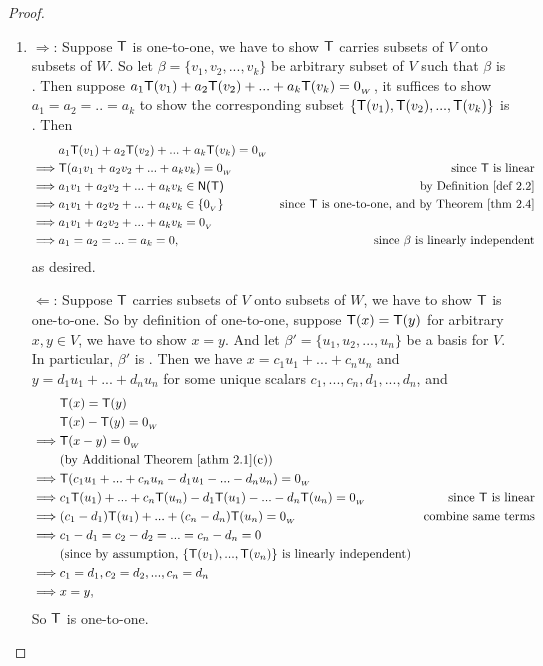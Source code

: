 \begin{proof} \ 
\begin{enumerate}
\item
\(\Longrightarrow\): Suppose \(\textsf{T}\) is one-to-one, we have to show \(\textsf{T}\) carries \LID{} subsets of \(V\) onto \LID{} subsets of \(W\).
So let \(\beta = \{ v_1, v_2, ..., v_k \}\) be arbitrary subset of \(V\) such that \(\beta\) is \LID{}.
Then suppose \(a_1\textsf{T}(v_1) + a_2\textsf{T}(v_2) + ... + a_k\textsf{T}(v_k) = 0_{_W}\), it suffices to show \(a_1 = a_2 = .. = a_k\) to show the corresponding subset \(\{ \textsf{T}(v_1), \textsf{T}(v_2), ..., \textsf{T}(v_k) \}\) is \LID{}.
Then
\begin{align*}
             & a_1\T(v_1) + a_2\T(v_2) + ... + a_k\T(v_k) = \OW \\
    \implies & \T(a_1 v_1 + a_2 v_2 + ... + a_k v_k) = \OW & \text{since \(\T\) is linear} \\
    \implies & a_1 v_1 + a_2 v_2 + ... + a_k v_k \in \NULLT & \text{by \DEF{2.2}} \\
    \implies & a_1 v_1 + a_2 v_2 + ... + a_k v_k \in \{ \OV \} & \text{since \(\T\) is one-to-one, and by \THM{2.4}} \\
    \implies & a_1 v_1 + a_2 v_2 + ... + a_k v_k = \OV \\
    \implies & a_1 = a_2 = ... = a_k = 0, & \text{since \(\beta\) is \LID{}}
\end{align*}
as desired.

\(\Longleftarrow\): Suppose \(\textsf{T}\) carries \LID{} subsets of \(V\) onto \LID{} subsets of \(W\), we have to show \(\textsf{T}\) is one-to-one.
So by definition of one-to-one, suppose \(\textsf{T}(x) = \textsf{T}(y)\) for arbitrary \(x, y \in V\), we have to show \(x = y\).
And let \(\beta' = \{ u_1, u_2, ..., u_n \}\) be a basis for \(V\).
In particular, \(\beta'\) is \LID{}.
Then we have \(x = c_1 u_1 + ... + c_n u_n\) and \(y = d_1 u_1 + ... + d_n u_n\) for some unique scalars \(c_1, ..., c_n, d_1, ..., d_n\), and
\begin{align*}
             & \T(x) = \T(y) \\
             & \T(x) - \T(y) = \OW \\
    \implies & \T(x - y) = \OW \\
             & \text{(by \ATHM{2.1}(c))} \\
    \implies & \T(c_1 u_1 + ... + c_n u_n - d_1 u_1 - ... - d_n u_n) = \OW \\
    \implies & c_1\T(u_1) + ... + c_n\T(u_n) - d_1\T(u_1) - ... - d_n\T(u_n) = \OW & \text{since \(\T\) is linear} \\
    \implies & (c_1 - d_1)\T(u_1) + ... + (c_n - d_n)\T(u_n) = \OW & \text{combine same terms} \\
    \implies & c_1 - d_1 = c_2 - d_2 = ... = c_n - d_n = 0 & \\
             & \text{(since by assumption, \(\{ \T(v_1), ..., \T(v_n) \}\) is \LID{})} \\
    \implies & c_1 = d_1, c_2 = d_2, ..., c_n = d_n \\
    \implies & x = y,
\end{align*}
So \(\textsf{T}\) is one-to-one.


\end{enumerate}
\end{proof}
